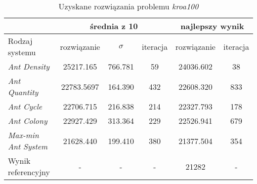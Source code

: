 {{{            \begin{table}[H]
                \centering
                \caption{Uzyskane rozwiązania problemu \textit{kroa100}}
                \begin{tabular}{ |l|c c c|c c| }
                    \hline
                    & \multicolumn{3}{c|}{średnia z 10} & \multicolumn{2}{c|}{najlepszy wynik} \\
                    \hline
                    Rodzaj systemu & rozwiązanie & $\sigma$ & iteracja & rozwiązanie & iteracja \\
                    \hline
                    \textit{Ant Density} & 25217.165 & 766.781 & 59 & 24036.602 & 38 \\
                    \textit{Ant Quantity} & 22783.5697 & 164.390 & 432 & 22608.320 & 833 \\
                    \textit{Ant Cycle} & 22706.715 & 216.838 & 214 & 22327.793 & 178 \\
                    \textit{Ant Colony} & 22927.429 & 313.364 & 229 & 22526.941 & 679 \\
                    \textit{Max-min Ant System} & 21628.440 & 199.410 & 380 & 21377.504 & 354 \\
                    \hline
                    Wynik referencyjny & - & - & - & 21282 & - \\
                    \hline
                \end{tabular}
                \label{tab:impl-tsp-results-kroa}
            \end{table}
        }
    }
}
